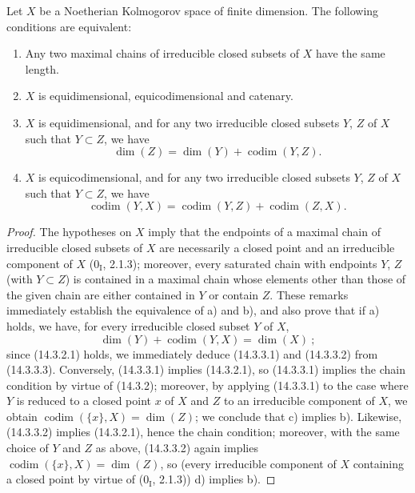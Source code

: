 \begin{proposition}[14.3.3]
\label{0.14.3.3}
Let $X$ be a Noetherian Kolmogorov space of finite dimension. The
following conditions are equivalent:
\begin{enumerate}
  \item[\rm(a)] Any two maximal chains of irreducible closed subsets of $X$
  have the same length.
  \item[\rm(b)] $X$ is equidimensional, equicodimensional and catenary.
  \item[\rm(c)] $X$ is equidimensional, and for any two irreducible closed
  subsets $Y$, $Z$ of $X$ such that $Y\subset Z$, we have
  \[
    \dim(Z)=\dim(Y)+\operatorname{codim}(Y,Z).
    \tag{14.3.3.1}\label{0.14.3.3.1}
  \]
  \item[\rm(d)] $X$ is equicodimensional, and for any two irreducible closed
  subsets $Y$, $Z$ of $X$ such that $Y\subset Z$, we have
  \[
    \operatorname{codim}(Y,X)=
    \operatorname{codim}(Y,Z)+\operatorname{codim}(Z,X).
    \tag{14.3.3.2}\label{0.14.3.3.2}
  \]
\end{enumerate}
\end{proposition}

\begin{proof}
The hypotheses on $X$ imply that the endpoints of a maximal chain of
irreducible closed subsets of $X$ are necessarily a closed point and
an irreducible component of $X$ ($0_{\mathrm I}$, 2.1.3); moreover, every
saturated chain with endpoints $Y$, $Z$ (with $Y\subset Z$) is contained in a
maximal chain whose elements other than those of the given chain are
either contained in $Y$ or contain $Z$. These remarks
immediately establish the equivalence of a) and b), and also prove that if a)
holds, we have, for every irreducible closed subset $Y$ of $X$,
\[
  \dim(Y)+\operatorname{codim}(Y,X)=\dim(X)~;
  \tag{14.3.3.3}\label{0.14.3.3.3}
\]
since (14.3.2.1) holds, we immediately deduce (14.3.3.1) and (14.3.3.2) from
(14.3.3.3). Conversely, (14.3.3.1) implies (14.3.2.1), so (14.3.3.1)
implies the chain condition by virtue of (14.3.2); moreover, by
applying (14.3.3.1) to the case where $Y$ is reduced to a closed point $x$ of $X$ and
$Z$ to an irreducible component of $X$, we obtain
$\operatorname{codim}(\{x\},X)=\dim(Z)$; we conclude that c) implies b).
Likewise, (14.3.3.2) implies (14.3.2.1), hence the chain condition;
moreover, with the same choice of $Y$ and $Z$ as above, (14.3.3.2) again
implies $\operatorname{codim}(\{x\},X)=\dim(Z)$, so (every irreducible
component of $X$ containing a closed point by virtue of ($0_{\mathrm I}$,
2.1.3)) d) implies b).
\end{proof}

